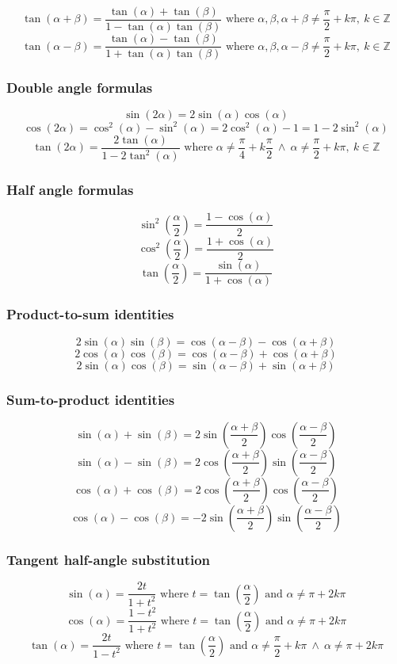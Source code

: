 \[
\tan(\alpha+\beta)=\frac{\tan(\alpha) + \tan(\beta)}{1-\tan(\alpha)\tan(\beta)} \text{ where } \alpha, \beta, \alpha+\beta \ne \frac{\pi}{2} + k\pi, \ k \in \mathbb{Z}
\]
\[
\tan(\alpha-\beta)=\frac{\tan(\alpha) - \tan(\beta)}{1+\tan(\alpha)\tan(\beta)} \text{ where } \alpha, \beta, \alpha-\beta \ne \frac{\pi}{2} + k\pi, \ k \in \mathbb{Z}
\]

\subsubsection{Double angle formulas}
\[
\sin(2\alpha) = 2\sin(\alpha)\cos(\alpha)
\]
\[
\cos(2\alpha)=\cos^2(\alpha)-\sin^2(\alpha) = 2\cos^2(\alpha)-1 = 1 - 2\sin^2(\alpha)
\]
\[
\tan(2\alpha) = \frac{2\tan(\alpha)}{1-2\tan^2(\alpha)} \text{ where } \alpha \ne \frac{\pi}{4}+k\frac{\pi}{2} \ \wedge \ \alpha \ne \frac{\pi}{2}+k\pi, \ k \in \mathbb{Z}
\]

\subsubsection{Half angle formulas}
\[
\sin^2\left(\frac{\alpha}{2}\right) = \frac{1-\cos(\alpha)}{2}
\]
\[
\cos^2\left(\frac{\alpha}{2}\right) = \frac{1+\cos(\alpha)}{2}
\]
\[
\tan\left(\frac{\alpha}{2}\right) = \frac{\sin(\alpha)}{1+\cos(\alpha)}
\]

\subsubsection{Product-to-sum identities}
\[
2\sin(\alpha)\sin(\beta) = \cos(\alpha-\beta) - \cos(\alpha+\beta)
\]
\[
2\cos(\alpha)\cos(\beta) = \cos(\alpha-\beta) + \cos(\alpha+\beta)
\]
\[
2\sin(\alpha)\cos(\beta) = \sin(\alpha-\beta) + \sin(\alpha+\beta)
\]

\subsubsection{Sum-to-product identities}
\[
\sin(\alpha)+\sin(\beta) = 2\sin\left(\frac{\alpha+\beta}{2}\right)\cos\left(\frac{\alpha-\beta}{2}\right)
\]
\[
\sin(\alpha)-\sin(\beta) = 2\cos\left(\frac{\alpha+\beta}{2}\right)\sin\left(\frac{\alpha-\beta}{2}\right)
\]
\[
\cos(\alpha)+\cos(\beta) = 2\cos\left(\frac{\alpha+\beta}{2}\right)\cos\left(\frac{\alpha-\beta}{2}\right)
\]
\[
\cos(\alpha)-\cos(\beta) = -2\sin\left(\frac{\alpha+\beta}{2}\right)\sin\left(\frac{\alpha-\beta}{2}\right)
\]

\subsubsection{Tangent half-angle substitution}
\[
\sin(\alpha) = \frac{2t}{1+t^2} \text{ where } t=\tan\left(\frac{\alpha}{2}\right) \text{ and } \alpha \ne \pi + 2k\pi
\]
\[
\cos(\alpha) = \frac{1-t^2}{1+t^2} \text{ where } t=\tan\left(\frac{\alpha}{2}\right) \text{ and } \alpha \ne \pi + 2k\pi
\]
\[
\tan(\alpha) = \frac{2t}{1-t^2} \text{ where } t=\tan\left(\frac{\alpha}{2}\right) \text{ and } \alpha \ne \frac{\pi}{2} + k\pi \ \wedge \ \alpha \ne \pi + 2k\pi
\]

